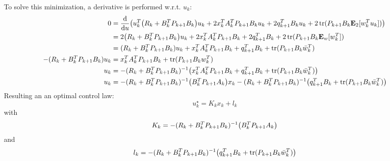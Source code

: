 \documentclass[]{article}
\begin{document}
To solve this minimization, a derivative is performed w.r.t. $u_k$:
\begin{align*}
    0 &= \dv{u} \qty(
        u_k^T \qty(R_k + B_k^T P_{k+1} B_k) u_k
        + 2 x_k^T A_k^T P_{k+1} B_k u_k
        + 2 q_{k+1}^T B_k u_k
        + 2 \trace(P_{k+1} B_k \vb{E}_2[w_k^T u_k])
    )\\
    &= 2 \qty(R_k + B_k^T P_{k+1} B_k) u_k
    + 2 x_k^T A_k^T P_{k+1} B_k
    + 2 q_{k+1}^T B_k
    + 2 \trace(P_{k+1} B_k \vb{E}_w[w_k^T])\\
    &= (R_k + B_k^T P_{k+1} B_k) u_k
    + x_k^T A_k^T P_{k+1} B_k
    + q_{k+1}^T B_k
    + \trace(P_{k+1} B_k \bar{w}_k^T)\\
    -(R_k + B_k^T P_{k+1} B_k) u_k
    &= x_k^T A_k^T P_{k+1} B_k
    + \trace(P_{k+1} B_k w_k^T)\\
    u_k &= -(R_k + B_k^T P_{k+1} B_k)^{-1} \qty(
        x_k^T A_k^T P_{k+1} B_k
        + q_{k+1}^T B_k
        + \trace(P_{k+1} B_k \bar{w}_k^T)
    )\\
    u_k &= -(R_k + B_k^T P_{k+1} B_k)^{-1} \qty(
        B_k^T P_{k+1} A_k) x_k
        - (R_k + B_k^T P_{k+1} B_k)^{-1} \qty(q_{k+1}^T B_k + \trace(P_{k+1} B_k \bar{w}_k^T))
\end{align*}
Resulting an an optimal control law:\[
    u_k^\star = K_k x_k + l_k
\] with \[
    K_k = -(R_k + B_k^T P_{k+1} B_k)^{-1} \qty(B_k^T P_{k+1} A_k)
\] and \[
    l_k = -(R_k + B_k^T P_{k+1} B_k)^{-1} \qty(q_{k+1}^T B_k + \trace(P_{k+1} B_k \bar{w}_k^T))
\]
\end{document}
